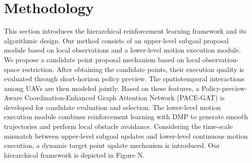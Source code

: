 






\section{Methodology}

This section introduces the hierarchical reinforcement learning framework and its algorithmic design. Our method consists of an upper-level subgoal proposal module based on local observations and a lower-level motion execution module. We propose a candidate point proposal mechanism based on local observation-space restriction. After obtaining the candidate points, their execution quality is evaluated through short-horizon policy preview. The spatiotemporal interactions among UAVs are then modeled jointly. Based on these features, a Policy-preview-Aware Coordination-Enhanced Graph Attention Network (PACE-GAT) is developed for candidate evaluation and selection. The lower-level motion execution module combines reinforcement learning with DMP to generate smooth trajectories and perform local obstacle avoidance. Considering the time-scale mismatch between upper-level subgoal updates and lower-level continuous motion execution, a dynamic target point update mechanism is introduced. Our hierarchical framework is depicted in Figure N.


